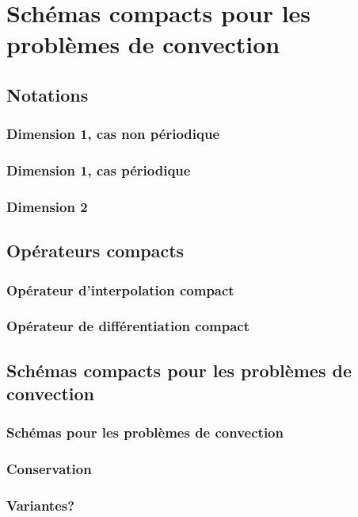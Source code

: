 
\chapter{Schémas compacts pour les problèmes de convection}

\section{Notations}

\subsection{Dimension 1, cas non périodique}

\subsection{Dimension 1, cas périodique}

\subsection{Dimension 2}


\section{Opérateurs compacts}

\subsection{Opérateur d'interpolation compact}

\subsection{Opérateur de différentiation compact}


\section{Schémas compacts pour les problèmes de convection}

\subsection{Schémas pour les problèmes de convection}

\subsection{Conservation}

\subsection{Variantes?}